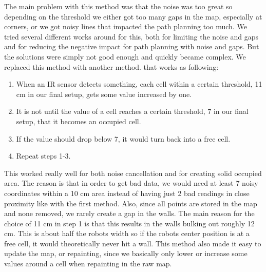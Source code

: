 The main problem with this method was that the noise was too great so depending on the threshold we either got too many gaps in the map, especially at corners, or we got noisy lines that impacted the path planning too much. We tried several different works around for this, both for limiting the noise and gaps and for reducing the negative impact for path planning with noise and gaps. But the solutions were simply not good enough and quickly became complex. We replaced this method with another method. that works as following:

\begin{enumerate}
\item When an IR sensor detects something, each cell within a certain threshold, 11 cm in our final setup, gets some value increased by one. 
\item It is not until the value of a cell reaches a certain threshold, 7 in our final setup, that it becomes an occupied cell. 
\item If the value should drop below 7, it would turn back into a free cell.
\item Repeat steps 1-3. 
\end{enumerate}

This worked really well for both noise cancellation and for creating solid occupied area. The reason is that in order to get bad data, we would need at least 7 noisy coordinates within a 10 cm area instead of having just 2 bad readings in close proximity like with the first method. Also, since all points are stored in the map and none removed, we rarely create a gap in the walls. The main reason for the choice of 11 cm in step 1 is that this results in the walls bulking out roughly 12 cm. This is about half the robots width so if the robots center position is at a free cell, it would theoretically never hit a wall. This method also made it easy to update the map, or repainting, since we basically only lower or increase some values around a cell when repainting in the raw map.

